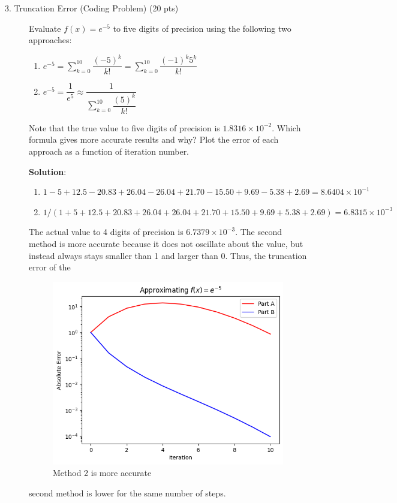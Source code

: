 \documentclass[12pt]{article}
\newcommand{\ds}{\displaystyle}
\begin{document}
\begin{description}
\item[3. Truncation Error \color{red} (Coding Problem) \color{black} (20 pts)] Evaluate $f (x) = e^{-5}$ to five digits of precision using the following two approaches:
    \begin{enumerate}[label=\textbf{(\alph*)}]
    \item $e^{-5} = \ds\sum^{10}_{k = 0} \dfrac{(-5)^k}{k!} = \ds\sum^{10}_{k = 0} \dfrac{(-1)^k 5^k}{k!}$
    \item $e^{-5} = \dfrac{1}{e^5} \approx \dfrac{1}{\ds\sum^{10}_{k = 0} \dfrac{(5)^k}{k!}}$
    \end{enumerate}
    Note that the true value to five digits of precision is $1.8316 \times 10^{-2}$. Which formula gives more accurate results and why? Plot the error of each approach as a function of iteration number.

    \color{red}
    \ifsolution
    {\bf Solution}:
    \begin{enumerate}[label=\textbf{(\alph*)}]
    \item $1-5+12.5-20.83+26.04-26.04+21.70-15.50+9.69-5.38+2.69 = 8.6404 \times 10^{-1}$ 
    \item $1/(1+5+12.5+20.83+26.04+26.04+21.70+15.50+9.69+5.38+2.69)  = 6.8315 \times 10^{-3}$
    \end{enumerate}
    The actual value to 4 digits of precision is $6.7379 \times 10^{-3}$. The second method is more accurate because it does not oscillate about the value, but instead always stays smaller than 1 and larger than 0. Thus, the truncation error of the     \begin{figure}[h!]
	\centering\includegraphics[width=4.5in]{HW1Fig2.png}
	\caption{Method 2 is more accurate}
	\label{fig:truncationError}
\end{figure}second method is lower for the same number of steps.
    

\end{description}
\end{document}
